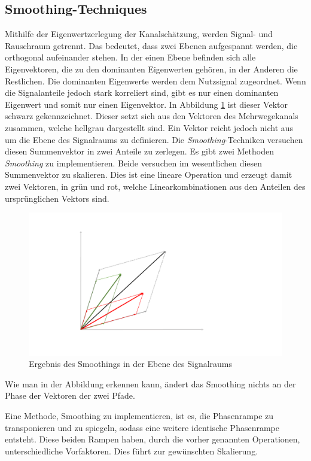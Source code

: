 \subsection{Smoothing-Techniques}
\label{chap3.3.1:Smoothing}
Mithilfe der Eigenwertzerlegung der Kanalschätzung, werden Signal- und Rauschraum getrennt. Das bedeutet, dass zwei Ebenen aufgespannt werden, die orthogonal aufeinander stehen. In der einen Ebene befinden sich alle Eigenvektoren, die zu den dominanten Eigenwerten gehören, in der Anderen die Restlichen. Die dominanten Eigenwerte werden dem Nutzsignal zugeordnet. Wenn die Signalanteile jedoch stark korreliert sind, gibt es nur einen dominanten Eigenwert und somit nur einen Eigenvektor. In Abbildung \ref{fig:SmoothingVektor} ist dieser Vektor schwarz gekennzeichnet. Dieser setzt sich aus den Vektoren des Mehrwegekanals zusammen, welche hellgrau dargestellt sind. Ein Vektor reicht jedoch nicht aus um die Ebene des Signalraums zu definieren. Die \emph{Smoothing}-Techniken versuchen diesen Summenvektor in zwei Anteile zu zerlegen. Es gibt zwei Methoden \emph{Smoothing} zu implementieren. Beide versuchen im wesentlichen diesen Summenvektor zu skalieren. Dies ist eine lineare Operation und erzeugt damit zwei Vektoren, in grün und rot, welche Linearkombinationen aus den Anteilen des ursprünglichen Vektors sind. 

\begin{figure}[htbp]
	\centering
	\includegraphics[scale=0.5]{images/SmoothingVektoren}
	\caption{Ergebnis des Smoothings in der Ebene des Signalraums}
	\label{fig:SmoothingVektor}
\end{figure}

Wie man in der Abbildung erkennen kann, ändert das Smoothing nichts an der Phase der Vektoren der zwei Pfade. 

Eine Methode, Smoothing zu implementieren, ist es, die Phasenrampe zu transponieren und zu spiegeln, sodass eine weitere identische Phasenrampe entsteht. Diese beiden Rampen haben, durch die vorher genannten Operationen, unterschiedliche Vorfaktoren. Dies führt zur gewünschten Skalierung. 


